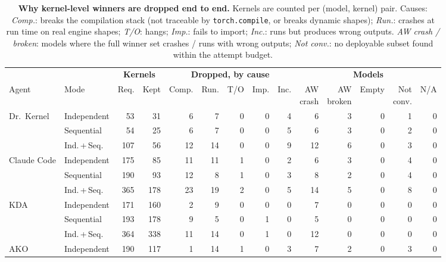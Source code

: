 \begin{table}[t]
  \centering
  \caption{\textbf{Why kernel-level winners are dropped end to end.} Kernels are counted per (model, kernel) pair.
  Causes: \emph{Comp.}: breaks the compilation stack (not traceable by \texttt{torch.compile}, or breaks dynamic shapes); \emph{Run.}: crashes at run time on real engine shapes; \emph{T/O}: hangs; \emph{Imp.}: fails to import; \emph{Inc.}: runs but produces wrong outputs.
  \emph{AW crash / broken}: models where the full winner set crashes / runs with wrong outputs; \emph{Not conv.}: no deployable subset found within the attempt budget.}
  \label{fastkernels:tab:e2e-drops}
  \small
  \setlength{\tabcolsep}{3pt}
  \begin{adjustbox}{max width=\linewidth}
\begin{tabular}{@{}ll rr rrrrr rrrrr@{}}
\toprule
 & & \multicolumn{2}{c}{\textbf{Kernels}} & \multicolumn{5}{c}{\textbf{Dropped, by cause}} & \multicolumn{5}{c}{\textbf{Models}} \\
\cmidrule(lr){3-4}\cmidrule(lr){5-9}\cmidrule(lr){10-14}
Agent & Mode & Req. & Kept & Comp. & Run. & T/O & Imp. & Inc. & \makecell{AW\\crash} & \makecell{AW\\broken} & Empty & \makecell{Not\\conv.} & N/A \\
\midrule
\multirow{3}{*}{Dr.~Kernel} & Independent & 53 & 31 & 6 & 7 & 0 & 0 & 4 & 6 & 3 & 0 & 1 & 0 \\
 & Sequential & 54 & 25 & 6 & 7 & 0 & 0 & 5 & 6 & 3 & 0 & 2 & 0 \\
 & Ind.\,+\,Seq. & 107 & 56 & 12 & 14 & 0 & 0 & 9 & 12 & 6 & 0 & 3 & 0 \\
\midrule
\multirow{3}{*}{Claude Code} & Independent & 175 & 85 & 11 & 11 & 1 & 0 & 2 & 6 & 3 & 0 & 4 & 0 \\
 & Sequential & 190 & 93 & 12 & 8 & 1 & 0 & 3 & 8 & 2 & 0 & 4 & 0 \\
 & Ind.\,+\,Seq. & 365 & 178 & 23 & 19 & 2 & 0 & 5 & 14 & 5 & 0 & 8 & 0 \\
\midrule
\multirow{3}{*}{KDA} & Independent & 171 & 160 & 2 & 9 & 0 & 0 & 0 & 7 & 0 & 0 & 0 & 0 \\
 & Sequential & 193 & 178 & 9 & 5 & 0 & 1 & 0 & 5 & 0 & 0 & 0 & 0 \\
 & Ind.\,+\,Seq. & 364 & 338 & 11 & 14 & 0 & 1 & 0 & 12 & 0 & 0 & 0 & 0 \\
\midrule
\multirow{3}{*}{AKO} & Independent & 190 & 117 & 1 & 14 & 1 & 0 & 3 & 7 & 2 & 0 & 3 & 0 \\

\end{tabular}
\end{adjustbox}
\end{table}
